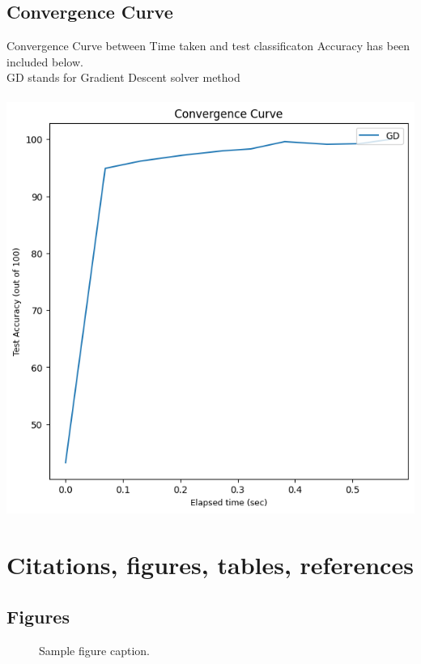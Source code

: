 \documentclass{article}
\begin{document}
\subsection{Convergence Curve}
Convergence Curve between Time taken and test classificaton Accuracy has been included below.\\
GD stands for Gradient Descent solver method\\
\\
\includegraphics[scale=1]{images/convergence.png}







\section{Citations, figures, tables, references}
\subsection{Figures}

\begin{figure}
  \centering
  \fbox{\rule[-.5cm]{0cm}{4cm} \rule[-.5cm]{4cm}{0cm}}
  \caption{Sample figure caption.}
\end{figure}
\end{document}
